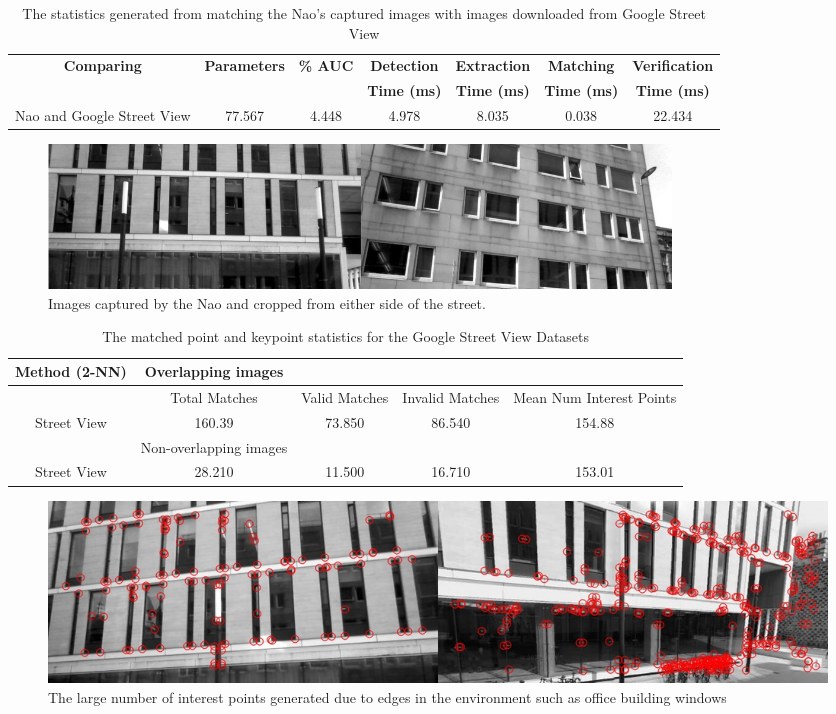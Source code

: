 \documentclass[11pt]{report}
\begin{document}
\begin{table}
\centering
\caption{The statistics generated from matching the Nao's captured images with
images downloaded from Google Street View}
\footnotesize
\begin{tabular}{|c|c|c|c|c|c|c|}
\hline 
\textbf{Comparing} & \textbf{Parameters} & \textbf{\% AUC} & \textbf{Detection} & \textbf{Extraction} & \textbf{Matching} & \textbf{Verification}\tabularnewline
 &  &  & \textbf{Time (ms)} & \textbf{Time (ms)} & \textbf{Time (ms)} & \textbf{Time (ms)}\tabularnewline
\hline 
\hline 
Nao and Google Street View & 77.567 & 4.448 & 4.978 & 8.035 & 0.038 & 22.434\tabularnewline
\hline 
\end{tabular}
\label{tab:naoGoogleStreetRoc}
\end{table}

 \begin{figure}[h!] 
  \centering
    \includegraphics[width=0.8\textwidth]{../Drawings/streetView/similarGooglePics.jpg}
    \caption{Images captured by the Nao and cropped from either side of the street.}
    \label{fig:similarGoogleStreetView}
\end{figure}

\begin{table}
\centering
\caption{The matched point and keypoint statistics for the Google Street View
Datasets}
\begin{tabular}{|c|c|c|c|c|}
\hline 
Method (2-NN) & Overlapping images &  &  & \tabularnewline
\hline 
\hline 
 & Total Matches & Valid Matches & Invalid Matches & Mean Num Interest Points\tabularnewline
\hline 
Street View  & 160.39 & 73.850 & 86.540 & 154.88\tabularnewline
\hline 
 & Non-overlapping images &  &  & \tabularnewline
\hline 
Street View & 28.210 & 11.500 & 16.710 & 153.01\tabularnewline
\hline 
\end{tabular}
\label{tab:google_matches_keypoints}
\end{table}


 \begin{figure}[h!] 
  \centering
    \includegraphics[width=1.0\textwidth]{../Drawings/Matching/google_street_interest_points.jpg}
    \caption{The large number of interest points generated due to edges in the environment such as office building windows}
    \label{fig:google_interest_points}
\end{figure}
\end{document}
